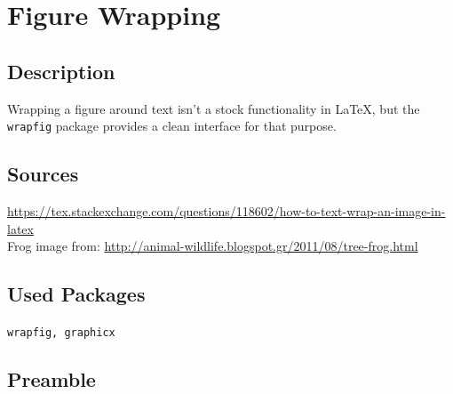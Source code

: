 \documentclass{article}
\begin{document}
\section*{Figure Wrapping}

\subsection*{Description}
Wrapping a figure around text isn't a stock functionality in \LaTeX, but the \verb|wrapfig| package provides a clean interface for that purpose.

\subsection*{Sources}
\url{https://tex.stackexchange.com/questions/118602/how-to-text-wrap-an-image-in-latex}\\
Frog image from: \url{http://animal-wildlife.blogspot.gr/2011/08/tree-frog.html}

\subsection*{Used Packages}
\verb|wrapfig, graphicx|

\subsection*{Preamble}
\begin{latex}
\usepackage{graphicx}
\usepackage{wrapfig}
\usepackage{lipsum}  %

\end{latex}
\end{document}
